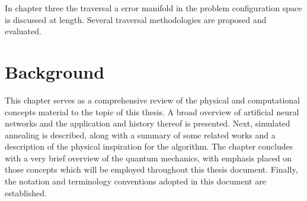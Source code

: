 \documentclass[11pt]{afthesis}
\begin{document}


In chapter three the traversal a error manifold in the problem configuration space is discussed at length. Several traversal methodologies are proposed and evaluated. 



\chapter{Background} %

This chapter serves as a comprehensive review of the physical and computational concepts material to the topic of this thesis. A broad overview of artificial neural networks and the application and history thereof is presented. Next, simulated annealing is described, along with a summary of some related works and a description of the physical inspiration for the algorithm. The chapter concludes with a very brief overview of the quantum mechanics, with emphasis placed on those concepts which will be employed throughout this thesis document. Finally, the notation and terminology conventions adopted in this document are established.
\end{document}

